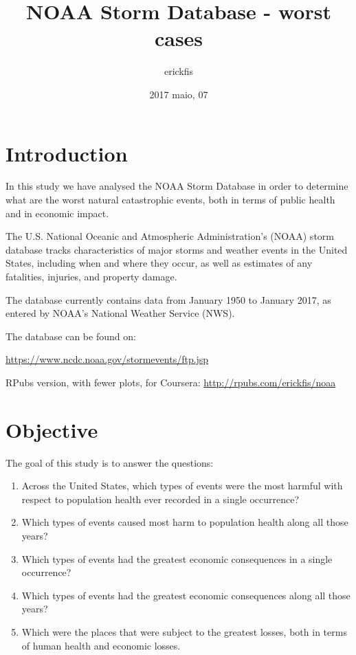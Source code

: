 \documentclass[]{article}
\title{NOAA Storm Database - worst cases}
\author{erickfis}
\date{2017 maio, 07}
\begin{document}
\maketitle

{
\setcounter{tocdepth}{3}
\tableofcontents
}
\section{Introduction}\label{introduction}

In this study we have analysed the NOAA Storm Database in order to
determine what are the worst natural catastrophic events, both in terms
of public health and in economic impact.

The U.S. National Oceanic and Atmospheric Administration's (NOAA) storm
database tracks characteristics of major storms and weather events in
the United States, including when and where they occur, as well as
estimates of any fatalities, injuries, and property damage.

The database currently contains data from January 1950 to January 2017,
as entered by NOAA's National Weather Service (NWS).

The database can be found on:

\url{https://www.ncdc.noaa.gov/stormevents/ftp.jsp}

RPubs version, with fewer plots, for Coursera:
\url{http://rpubs.com/erickfis/noaa}

\section{Objective}\label{objective}

The goal of this study is to answer the questions:

\begin{enumerate}
\def\labelenumi{\arabic{enumi}.}
\item
  Across the United States, which types of events were the most harmful
  with respect to population health ever recorded in a single
  occurrence?
\item
  Which types of events caused most harm to population health along all
  those years?
\item
  Which types of events had the greatest economic consequences in a
  single occurrence?
\item
  Which types of events had the greatest economic consequences along all
  those years?
\item
  Which were the places that were subject to the greatest losses, both
  in terms of human health and economic losses.
\end{enumerate}
\end{document}
